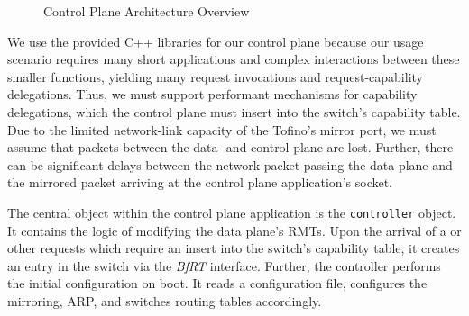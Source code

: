 \begin{figure}[H]
  \centering
  \resizebox{\textwidth}{!}{
    
  }
  \caption{\label{fig:controlplane-arch} Control Plane Architecture Overview}
\end{figure}

We use the provided C++ libraries for our control plane because our usage scenario requires many short applications and complex interactions between these smaller functions, yielding many request invocations and request-capability delegations. Thus, we must support performant mechanisms for capability delegations, which the control plane must insert into the switch's capability table. Due to the limited network-link capacity of the Tofino's mirror port, we must assume that packets between the data- and control plane are lost. Further, there can be significant delays between the network packet passing the data plane and the mirrored packet arriving at the control plane application's socket.

The central object within the control plane application is the \texttt{controller} object. It contains the logic of modifying the data plane's \acp{RMT}. Upon the arrival of a  or other requests which require an insert into the switch's capability table, it creates an entry in the switch via the \emph{BfRT} interface.
Further, the controller performs the initial configuration on boot. It reads a configuration file, configures the mirroring, \ac{ARP}, and switches routing tables accordingly.

